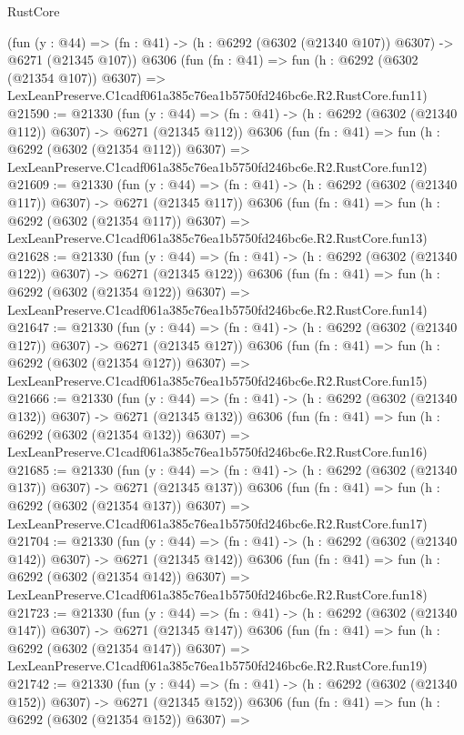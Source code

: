 \begin{lexlean}{RustCore}
\begin{coremodule}
    (fun (y : @44) => (fn : @41) -> (h : @6292 (@6302 (@21340 @107)) @6307) -> @6271 (@21345 @107))
    @6306
    (fun (fn : @41) =>
    fun (h : @6292 (@6302 (@21354 @107)) @6307) =>
    LexLeanPreserve.C1cadf061a385c76ea1b5750fd246bc6e.R2.RustCore.fun11)
@21590 := @21330
    (fun (y : @44) => (fn : @41) -> (h : @6292 (@6302 (@21340 @112)) @6307) -> @6271 (@21345 @112))
    @6306
    (fun (fn : @41) =>
    fun (h : @6292 (@6302 (@21354 @112)) @6307) =>
    LexLeanPreserve.C1cadf061a385c76ea1b5750fd246bc6e.R2.RustCore.fun12)
@21609 := @21330
    (fun (y : @44) => (fn : @41) -> (h : @6292 (@6302 (@21340 @117)) @6307) -> @6271 (@21345 @117))
    @6306
    (fun (fn : @41) =>
    fun (h : @6292 (@6302 (@21354 @117)) @6307) =>
    LexLeanPreserve.C1cadf061a385c76ea1b5750fd246bc6e.R2.RustCore.fun13)
@21628 := @21330
    (fun (y : @44) => (fn : @41) -> (h : @6292 (@6302 (@21340 @122)) @6307) -> @6271 (@21345 @122))
    @6306
    (fun (fn : @41) =>
    fun (h : @6292 (@6302 (@21354 @122)) @6307) =>
    LexLeanPreserve.C1cadf061a385c76ea1b5750fd246bc6e.R2.RustCore.fun14)
@21647 := @21330
    (fun (y : @44) => (fn : @41) -> (h : @6292 (@6302 (@21340 @127)) @6307) -> @6271 (@21345 @127))
    @6306
    (fun (fn : @41) =>
    fun (h : @6292 (@6302 (@21354 @127)) @6307) =>
    LexLeanPreserve.C1cadf061a385c76ea1b5750fd246bc6e.R2.RustCore.fun15)
@21666 := @21330
    (fun (y : @44) => (fn : @41) -> (h : @6292 (@6302 (@21340 @132)) @6307) -> @6271 (@21345 @132))
    @6306
    (fun (fn : @41) =>
    fun (h : @6292 (@6302 (@21354 @132)) @6307) =>
    LexLeanPreserve.C1cadf061a385c76ea1b5750fd246bc6e.R2.RustCore.fun16)
@21685 := @21330
    (fun (y : @44) => (fn : @41) -> (h : @6292 (@6302 (@21340 @137)) @6307) -> @6271 (@21345 @137))
    @6306
    (fun (fn : @41) =>
    fun (h : @6292 (@6302 (@21354 @137)) @6307) =>
    LexLeanPreserve.C1cadf061a385c76ea1b5750fd246bc6e.R2.RustCore.fun17)
@21704 := @21330
    (fun (y : @44) => (fn : @41) -> (h : @6292 (@6302 (@21340 @142)) @6307) -> @6271 (@21345 @142))
    @6306
    (fun (fn : @41) =>
    fun (h : @6292 (@6302 (@21354 @142)) @6307) =>
    LexLeanPreserve.C1cadf061a385c76ea1b5750fd246bc6e.R2.RustCore.fun18)
@21723 := @21330
    (fun (y : @44) => (fn : @41) -> (h : @6292 (@6302 (@21340 @147)) @6307) -> @6271 (@21345 @147))
    @6306
    (fun (fn : @41) =>
    fun (h : @6292 (@6302 (@21354 @147)) @6307) =>
    LexLeanPreserve.C1cadf061a385c76ea1b5750fd246bc6e.R2.RustCore.fun19)
@21742 := @21330
    (fun (y : @44) => (fn : @41) -> (h : @6292 (@6302 (@21340 @152)) @6307) -> @6271 (@21345 @152))
    @6306
    (fun (fn : @41) =>
    fun (h : @6292 (@6302 (@21354 @152)) @6307) =>

\end{coremodule}
\end{lexlean}
